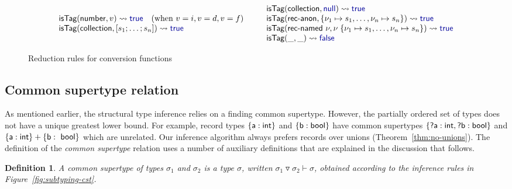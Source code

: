 \documentclass[preprint]{sigplanconf}
\newcommand{\kvd}[1]{\textnormal{\textcolor{kvdclr}{\sffamily #1}}}
\newcommand{\ident}[1]{\textnormal{\sffamily #1}}
\newcommand{\reduce}{\rightsquigarrow}
\newtheorem{definition}{Definition}
\begin{document}
\begin{figure}
\begin{equation*}
\begin{array}{l}
 \ident{isTag}(\ident{number}, v) \reduce \kvd{true} \quad(\textnormal{when}~v=i, v=d, v=f) \\
 \ident{isTag}(\ident{collection}, [s_1; \ldots; s_n]) \reduce \kvd{true} \\
\end{array}
\hspace{1.8em}
\begin{array}{l}
 \ident{isTag}(\ident{collection}, \kvd{null}) \reduce \kvd{true} \\
 \ident{isTag}(\ident{rec-anon}, \{ \nu_1\mapsto s_1, \ldots, \nu_n\mapsto s_n \}) \reduce \kvd{true} \\
 \ident{isTag}(\ident{rec-named}~\nu, \nu\;\{ \nu_1\mapsto s_1, \ldots, \nu_n\mapsto s_n \}) \reduce \kvd{true} \\
 \ident{isTag}(\_, \_) \reduce \kvd{false} \\
\end{array}
\end{equation*}

\caption{Reduction rules for conversion functions}
\label{fig:op-conversions}
\end{figure}


\subsection{Common supertype relation}
\label{sec:inference-commonsuper}

As mentioned earlier, the structural type inference relies on a finding common supertype. However,
the partially ordered set of types does not have a unique greatest lower bound. For example, record types
$\{\ident{a}:\ident{int}\}$ and $\{\ident{b}:\ident{bool}\}$ have common supertypes
$\{\ident{?a}:\ident{int}, \ident{?b}:\ident{bool}\}$ and $\{\ident{a}:\ident{int}\} + \{\ident{b}:\ident{bool}\}$
which are unrelated. Our inference algorithm always prefers records over unions (Theorem~\ref{thm:no-unions}). 
The definition of the \emph{common supertype} relation uses a number of auxiliary definitions 
that are explained in the discussion that follows.

\begin{definition}
A \emph{common supertype} of types $\sigma_1$ and $\sigma_2$ is a type $\sigma$, written 
$\sigma_1 \triangledown \sigma_2 \vdash \sigma$, obtained according to the inference rules in 
Figure~\ref{fig:subtyping-cst}.
\end{definition}
\end{document}
